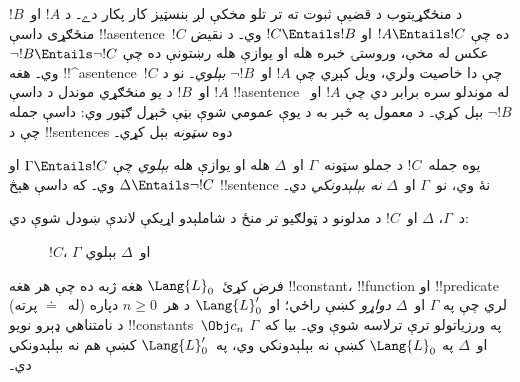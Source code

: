 \documentclass[../../../include/open-logic-section]{subfiles}
\begin{document}


د منځګړيتوب د قضيې ثبوت ته تر تلو مخکې لږ بنسټيز کار پکار دے۔ د
$!A$ او~$!B$ منځګړی داسې !!a{sentence}~$!C$ ده چې
$!A \Entails !C$ او $!C \Entails !B$ وي۔ د نقيض عکس له مخې،
وروستۍ خبره هله او يوازې هله رښتونې ده چې
$\lnot !B \Entails \lnot !C$ وي۔ هغه !!^a{sentence}~$!C$ چې دا
خاصيت ولري، ويل کېږي چې $!A$ او~$\lnot !B$ \emph{بېلوي}۔ نو د
$!A$ او~$!B$ د يو منځګړي موندل د داسې !!a{sentence} له موندلو سره
برابر دي چې $!A$ او~$\lnot !B$ بېل کړي۔ د معمول په څېر به د يوې
عمومي شوې بڼې څېړل ګټور وي: داسې جمله چې د !!{sentence}s دوه
\emph{سټونه} بېل کړي۔

\begin{defn}
يوه جمله~$!C$ د جملو سټونه~$\Gamma$ او~$\Delta$ هله او يوازې هله
\emph{بېلوي} چې $\Gamma \Entails !C$ او
$\Delta \Entails \lnot !C$ وي۔ که داسې هېڅ !!{sentence} نۀ وي،
نو~$\Gamma$ او~$\Delta$ \emph{نه بېلېدونکي} دي۔
\end{defn}

د~$\Gamma$، $\Delta$ او~$!C$ د مدلونو د ټولګيو تر منځ د شاملېدو
اړيکې لاندې ښودل شوې دي:
\begin{figure}[h]
  \centering
  \caption{$!C$، $\Gamma$ او~$\Delta$ بېلوي}
\end{figure}


\begin{lem}
فرض کړئ~$\Lang{L}_0$ هغه ژبه ده چې هر هغه !!{constant}،
!!{function} او !!{predicate} (له~$\doteq$ پرته) لري چې په
$\Gamma$ او~$\Delta$ \emph{دواړو} کښې راځي؛ او~$\Lang{L}'_0$ د
هر~$n \ge 0$ دپاره د نامتناهي ډېرو نويو !!{constant}s~$\Obj c_n$
په ورزياتولو ترې ترلاسه شوې وي۔ بيا که~$\Gamma$ او~$\Delta$ په
$\Lang{L}_0$ کښې نه بېلېدونکي وي، په~$\Lang{L}'_0$ کښې هم نه
بېلېدونکي دي۔
\end{lem}
\end{document}

